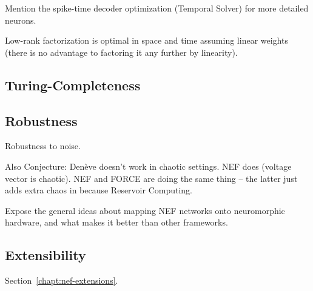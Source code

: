 Mention the spike-time decoder optimization (Temporal Solver) for more detailed neurons.

Low-rank factorization is optimal in space and time assuming linear weights (there is no advantage to factoring it any further by linearity).

\subsection{Turing-Completeness}


\subsection{Robustness}

Robustness to noise.

Also Conjecture: Den\`eve doesn't work in chaotic settings. NEF does (voltage vector is chaotic). NEF and FORCE are doing the same thing -- the latter just adds extra chaos in because Reservoir Computing.



Expose the general ideas about mapping NEF networks onto neuromorphic hardware, and what makes it better than other frameworks.


\subsection{Extensibility}

Section~\ref{chapt:nef-extensions}.
